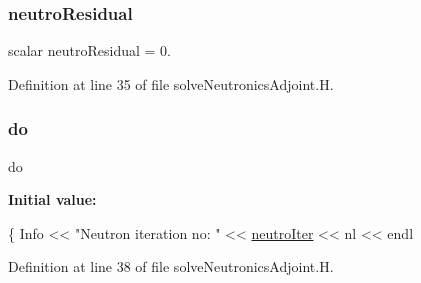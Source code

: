\subsubsection{\texorpdfstring{neutro\+Residual}{neutroResidual}}
{\footnotesize\ttfamily scalar neutro\+Residual = 0.}



Definition at line 35 of file solve\+Neutronics\+Adjoint.\+H.

\mbox{\label{solveNeutronicsAdjoint_8H_a721c6ff80a6d3e4ad4ffa52a04c60085}} 
\subsubsection{\texorpdfstring{do}{do}}
{\footnotesize\ttfamily do}

{\bfseries Initial value\+:}
\begin{DoxyCode}
\{
    Info << \textcolor{stringliteral}{"Neutron iteration no:  "} << \hyperlink{solveNeutronicsAdjoint_8H_a5ea48e0170faff29dfdd3cbba330d51d}{neutroIter} << nl << endl
\end{DoxyCode}


Definition at line 38 of file solve\+Neutronics\+Adjoint.\+H.

